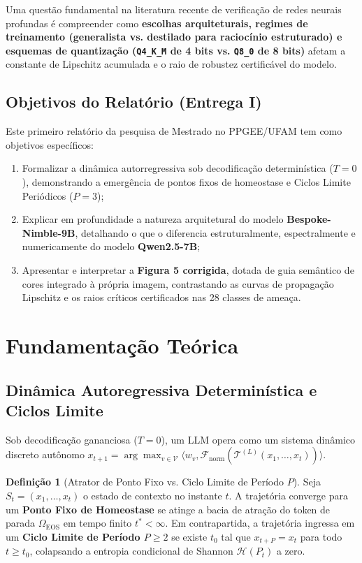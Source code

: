 \documentclass[11pt,a4paper]{article}
\theoremstyle{definition}
\newtheorem{definition}{Definição}
\begin{document}
Uma questão fundamental na literatura recente de verificação de redes neurais profundas é compreender como \textbf{escolhas arquiteturais, regimes de treinamento (generalista vs. destilado para raciocínio estruturado) e esquemas de quantização (\texttt{Q4\_K\_M} de 4 bits vs. \texttt{Q8\_0} de 8 bits)} afetam a constante de Lipschitz acumulada e o raio de robustez certificável do modelo.

\subsection{Objetivos do Relatório (Entrega I)}
Este primeiro relatório da pesquisa de Mestrado no PPGEE/UFAM tem como objetivos específicos:
\begin{enumerate}
    \item Formalizar a dinâmica autorregressiva sob decodificação determinística ($T=0$), demonstrando a emergência de pontos fixos de homeostase e Ciclos Limite Periódicos ($P=3$);
    \item Explicar em profundidade a natureza arquitetural do modelo \textbf{Bespoke-Nimble-9B}, detalhando o que o diferencia estruturalmente, espectralmente e numericamente do modelo \textbf{Qwen2.5-7B};
    \item Apresentar e interpretar a \textbf{Figura 5 corrigida}, dotada de guia semântico de cores integrado à própria imagem, contrastando as curvas de propagação Lipschitz e os raios críticos certificados nas 28 classes de ameaça.
\end{enumerate}

\section{Fundamentação Teórica}

\subsection{Dinâmica Autoregressiva Determinística e Ciclos Limite}

Sob decodificação gananciosa ($T = 0$), um LLM opera como um sistema dinâmico discreto autônomo $x_{t+1} = \arg\max_{v \in \mathcal{V}} \langle w_v, \mathcal{F}_{\text{norm}}(\mathcal{T}^{(L)}(x_1, \dots, x_t)) \rangle$.

\begin{definition}[Atrator de Ponto Fixo vs. Ciclo Limite de Período $P$]
Seja $S_t = (x_1, \dots, x_t)$ o estado de contexto no instante $t$. A trajetória converge para um \textbf{Ponto Fixo de Homeostase} se atinge a bacia de atração do token de parada $\Omega_{\text{EOS}}$ em tempo finito $t^* < \infty$. Em contrapartida, a trajetória ingressa em um \textbf{Ciclo Limite de Período $P \ge 2$} se existe $t_0$ tal que $x_{t+P} = x_t$ para todo $t \ge t_0$, colapsando a entropia condicional de Shannon $\mathcal{H}(P_t)$ a zero.
\end{definition}
\end{document}
